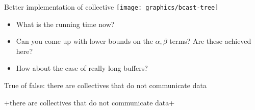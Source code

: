 \begin{numberedframe}{Better implementation of collective}
  \texttt{[image: graphics/bcast-tree]}
  
  \begin{itemize}
  \item
    What is the running time now?
  \item
    Can you come up with lower bounds on the $\alpha,\beta$ terms? Are
    these achieved here?
  \item How about the case of really long buffers?
  \end{itemize}

\end{numberedframe}

\begin{reviewframe}
  True of false: there are collectives that do not communicate data

  \slackpollTF+there are collectives that do not communicate data+
\end{reviewframe}

\endinput

\begin{numberedframe}{}
\begin{lstlisting}
  
\end{lstlisting}
\end{numberedframe}

\begin{numberedframe}{}
\begin{lstlisting}
  
\end{lstlisting}
\end{numberedframe}

\begin{numberedframe}{}
\begin{verbatim}
  
\end{verbatim}
\end{numberedframe}

